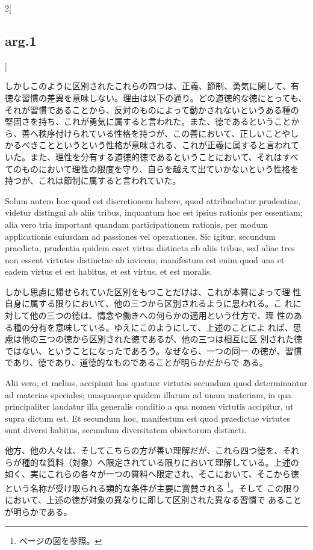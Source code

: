 \documentclass[paper=a4paper,fontsize=10pt,jafontsize=9pt,titlepage]{jlreq}
\begin{document}
\begin{paracol}{2}[\subsection{arg.1}]
\switchcolumn

しかしこのように区別されたこれらの四つは、正義、節制、勇気に関して、有
徳な習慣の差異を意味しない。理由は以下の通り。どの道徳的な徳にとっても、
それが習慣であることから、反対のものによって動かされないというある種の
堅固さを持ち、これが勇気に属すると言われた。また、徳であるということか
ら、善へ秩序付けられている性格を持つが、この善において、正しいことやし
かるべきことというという性格が意味される、これが正義に属すると言われて
いた。また、理性を分有する道徳的徳であるということにおいて、それはすべ
てのものにおいて理性の限度を守り、自らを越えて出ていかないという性格を
持つが、これは節制に属すると言われていた。

\switchcolumn*

Solum autem hoc quod est discretionem habere, quod attribuebatur
  prudentiae, videtur distingui ab aliis tribus, inquantum hoc est
  ipsius rationis per essentiam; alia vero tria important quandam
  participationem rationis, per modum applicationis cuiusdam ad
  passiones vel operationes. Sic igitur, secundum praedicta, prudentia
  quidem esset virtus distincta ab aliis tribus, sed aliae tres non
  essent virtutes distinctae ab invicem; manifestum est enim quod una
  et eadem virtus et est habitus, et est virtus, et est moralis.

\switchcolumn

しかし思慮に帰せられていた区別をもつことだけは、これが本質によって理
 性自身に属する限りにおいて、他の三つから区別されるように思われる。こ
 れに対して他の三つの徳は、情念や働きへの何らかの適用という仕方で、理
 性のある種の分有を意味している。ゆえにこのようにして、上述のことによ
 れば、思慮は他の三つの徳から区別された徳であるが、他の三つは相互に区
 別された徳ではない、ということになったであろう。なぜなら、一つの同一
 の徳が、習慣であり、徳であり、道徳的なものであることが明らかだからで
 ある。

\switchcolumn*

Alii vero, et melius, accipiunt has quatuor virtutes secundum quod
 determinantur ad materias speciales; unaquaeque quidem illarum ad
 unam materiam, in qua principaliter laudatur illa generalis conditio
 a qua nomen virtutis accipitur, ut supra dictum est. Et secundum hoc,
 manifestum est quod praedictae virtutes sunt diversi habitus,
 secundum diversitatem obiectorum distincti.

\switchcolumn

他方、他の人々は、そしてこちらの方が善い理解だが、これら四つ徳を、それ
らが種的な質料（対象）へ限定されている限りにおいて理解している。上述の
如く、実にこれらの各々が一つの質料へ限定され、そこにおいて、そこから徳
という名称が受け取られる類的な条件が主要に賞賛される
\footnote{\pageref{schema:cardinal_virtues}ページの図を参照。}。そして
この限りにおいて、上述の徳が対象の異なりに即して区別された異なる習慣で
あることが明らかである。


\end{paracol}
\end{document}
